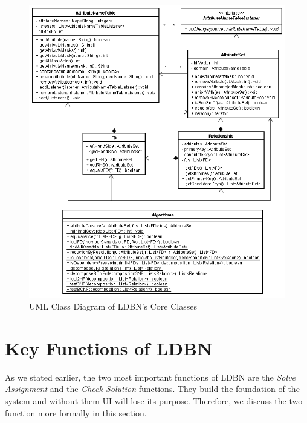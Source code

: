 \begin{figure}[htbp]
  \begin{center}
\hspace*{-0.5cm}\includegraphics[width=1.08\textwidth]{./img/uml-std.png}
    \caption{UML Class Diagram of LDBN's Core Classes}
    \label{fig:coreuml}
  \end{center}
\end{figure}



\section{Key Functions of LDBN}
\label{sec:keyfunctions}
As we stated earlier, the two most important functions of LDBN are the \textit{Solve Assignment} and 
the \textit{Check Solution} functions. They build the foundation of the system and
without them UI will lose its purpose. Therefore, we
discuss the two function more formally in this section.


